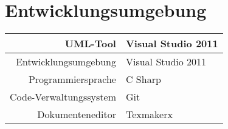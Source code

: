 \chapter{Entwicklungsumgebung}
\begin{tabular}{r|l}
UML-Tool & Visual Studio 2011 \\ 
\hline 
Entwicklungsumgebung & Visual Studio 2011 \\ 
\hline 
Programmiersprache & C Sharp \\ 
\hline 
Code-Verwaltungssystem & Git \\ 
\hline 
Dokumenteneditor & Texmakerx \\ 
\end{tabular}